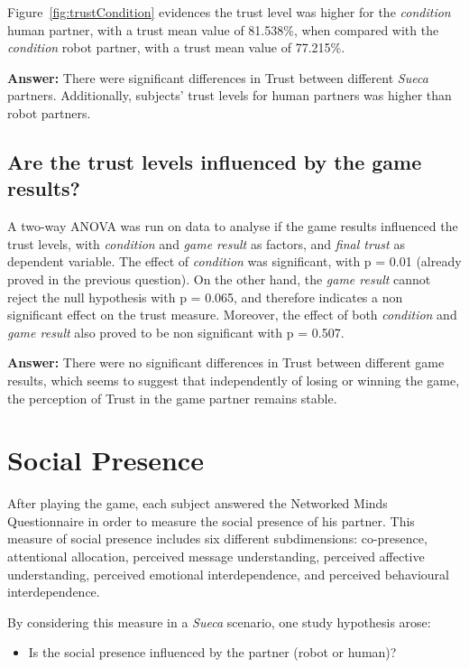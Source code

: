 Figure~\ref{fig:trustCondition} evidences the trust level was higher for the \emph{condition} human partner, with a trust mean value of 81.538\%, when compared with the \emph{condition} robot partner, with a trust mean value of 77.215\%.

\textbf{Answer:} There were significant differences in Trust between different \emph{Sueca} partners.
Additionally, subjects' trust levels for human partners was higher than robot partners.


\subsection*{Are the trust levels influenced by the game results?}
A two-way ANOVA was run on data to analyse if the game results influenced the trust levels, with \emph{condition} and \emph{game result} as factors, and \emph{final trust} as dependent variable.
The effect of \emph{condition} was significant, with p = 0.01 (already proved in the previous question).
On the other hand, the \emph{game result} cannot reject the null hypothesis with p = 0.065, and therefore indicates a non significant effect on the trust measure.
Moreover, the effect of both \emph{condition} and \emph{game result} also proved to be non significant with p = 0.507.

\textbf{Answer:} There were no significant differences in Trust between different game results, which seems to suggest that independently of losing or winning the game, the perception of Trust in the game partner remains stable.


\section{Social Presence}
\label{sec:socialPresence}
After playing the game, each subject answered the Networked Minds Questionnaire in order to measure the social presence of his partner.
This measure of social presence includes six different subdimensions: co-presence, attentional allocation, perceived message understanding, perceived affective understanding, perceived emotional interdependence, and perceived behavioural interdependence.

By considering this measure in a \emph{Sueca} scenario, one study hypothesis arose:
\begin{itemize}
\item Is the social presence influenced by the partner (robot or human)?
\end{itemize}

